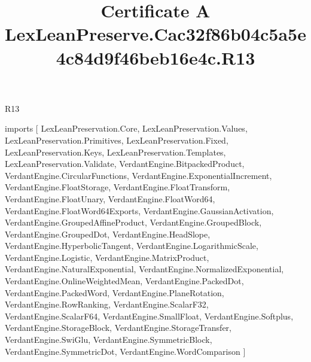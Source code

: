 \begin{lexlean}{R13}
\title{Certificate A LexLeanPreserve.Cac32f86b04c5a5e4c84d9f46beb16e4c.R13}
\begin{coremodule}
imports [
  LexLeanPreservation.Core,
  LexLeanPreservation.Values,
  LexLeanPreservation.Primitives,
  LexLeanPreservation.Fixed,
  LexLeanPreservation.Keys,
  LexLeanPreservation.Templates,
  LexLeanPreservation.Validate,
  VerdantEngine.BitpackedProduct,
  VerdantEngine.CircularFunctions,
  VerdantEngine.ExponentialIncrement,
  VerdantEngine.FloatStorage,
  VerdantEngine.FloatTransform,
  VerdantEngine.FloatUnary,
  VerdantEngine.FloatWord64,
  VerdantEngine.FloatWord64Exports,
  VerdantEngine.GaussianActivation,
  VerdantEngine.GroupedAffineProduct,
  VerdantEngine.GroupedBlock,
  VerdantEngine.GroupedDot,
  VerdantEngine.HeadSlope,
  VerdantEngine.HyperbolicTangent,
  VerdantEngine.LogarithmicScale,
  VerdantEngine.Logistic,
  VerdantEngine.MatrixProduct,
  VerdantEngine.NaturalExponential,
  VerdantEngine.NormalizedExponential,
  VerdantEngine.OnlineWeightedMean,
  VerdantEngine.PackedDot,
  VerdantEngine.PackedWord,
  VerdantEngine.PlaneRotation,
  VerdantEngine.RowRanking,
  VerdantEngine.ScalarF32,
  VerdantEngine.ScalarF64,
  VerdantEngine.SmallFloat,
  VerdantEngine.Softplus,
  VerdantEngine.StorageBlock,
  VerdantEngine.StorageTransfer,
  VerdantEngine.SwiGlu,
  VerdantEngine.SymmetricBlock,
  VerdantEngine.SymmetricDot,
  VerdantEngine.WordComparison
]


\end{coremodule}
\end{lexlean}
